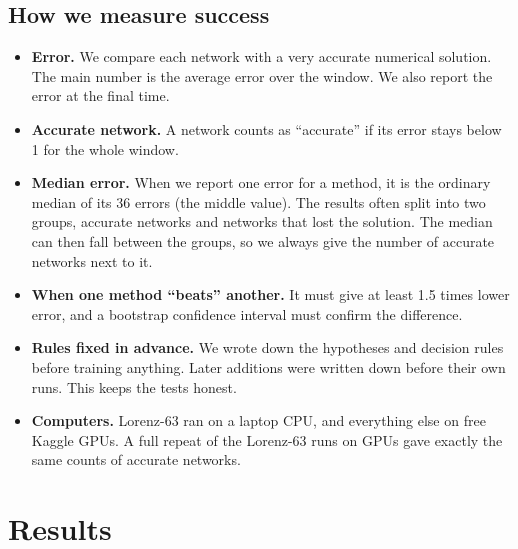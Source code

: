 \documentclass[11pt,a4paper]{article}
\begin{document}
\subsection{How we measure success}
\begin{itemize}
\item \textbf{Error.} We compare each network with a very accurate numerical solution.
  The main number is the average error over the window. We also report the error at
  the final time.
\item \textbf{Accurate network.} A network counts as ``accurate'' if its error stays below
  1 for the whole window.
\item \textbf{Median error.} When we report one error for a method, it is the ordinary
  median of its 36 errors (the middle value). The results often split into two groups,
  accurate networks and networks that lost the solution. The median can then fall between
  the groups, so we always give the number of accurate networks next to it.
\item \textbf{When one method ``beats'' another.} It must give at least 1.5 times lower
  error, and a bootstrap confidence interval must confirm the difference.
\item \textbf{Rules fixed in advance.} We wrote down the hypotheses and decision rules
  before training anything. Later additions were written down before their own runs.
  This keeps the tests honest.
\item \textbf{Computers.} Lorenz-63 ran on a laptop CPU, and everything else on free
  Kaggle GPUs. A full repeat of the Lorenz-63 runs on GPUs gave exactly the same counts of
  accurate networks.
\end{itemize}

\section{Results}
\end{document}
